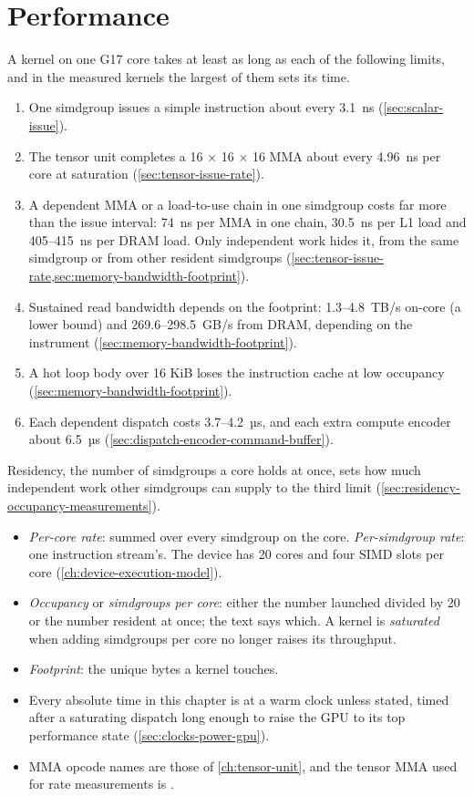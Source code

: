 \chapter{Performance}\label{ch:performance}

A kernel on one G17 core takes at least as long as each of the following limits, and in the measured kernels the
largest of them sets its time.

\begin{enumerate}
\def\labelenumi{\arabic{enumi}.}
\item One simdgroup issues a simple instruction about every 3.1~ns (\cref{sec:scalar-issue}).
\item The tensor unit completes a 16 × 16 × 16 MMA about every 4.96~ns per core at saturation
  (\cref{sec:tensor-issue-rate}).
\item A dependent MMA or a load-to-use chain in one simdgroup costs far more than the issue interval: 74~ns per MMA in
  one chain, 30.5~ns per L1 load and 405–415~ns per DRAM load. Only independent work hides it, from the same simdgroup
  or from other resident simdgroups (\cref{sec:tensor-issue-rate,sec:memory-bandwidth-footprint}).
\item Sustained read bandwidth depends on the footprint: 1.3–4.8~TB/s on-core (a lower bound) and
  269.6–298.5~GB/s from DRAM, depending on the instrument (\cref{sec:memory-bandwidth-footprint}).
\item A hot loop body over 16 KiB loses the instruction cache at low occupancy (\cref{sec:memory-bandwidth-footprint}).
\item Each dependent dispatch costs 3.7–4.2~µs, and each extra compute encoder about 6.5~µs
  (\cref{sec:dispatch-encoder-command-buffer}).
\end{enumerate}

Residency, the number of simdgroups a core holds at once, sets how much independent work other simdgroups can supply
to the third limit (\cref{sec:residency-occupancy-measurements}).


\begin{itemize}
\item \emph{Per-core rate}: summed over every simdgroup on the core. \emph{Per-simdgroup rate}: one instruction
  stream's. The device has 20 cores and four SIMD slots per core (\cref{ch:device-execution-model}).
\item \emph{Occupancy} or \emph{simdgroups per core}: either the number launched divided by 20 or the number resident
  at once; the text says which. A kernel is \emph{saturated} when adding simdgroups per core no longer raises its
  throughput.
\item \emph{Footprint}: the unique bytes a kernel touches.
\item Every absolute time in this chapter is at a warm clock unless stated, timed after a saturating dispatch long
  enough to raise the GPU to its top performance state (\cref{sec:clocks-power-gpu}).
\item MMA opcode names are those of \cref{ch:tensor-unit}, and the tensor MMA used for rate measurements is .
\end{itemize}

